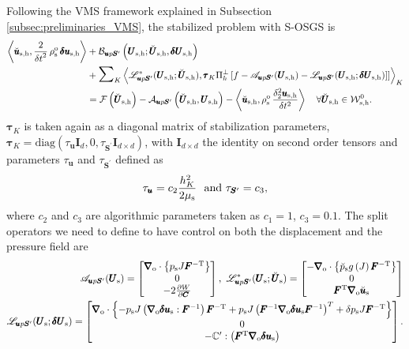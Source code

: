 \documentclass[11pt,english]{article}
\def\psolid{p_{\rm{s}}}                         %
\def\devPK{\pmb{S}^\prime}                      %
\def\unknosolid{\pmb{U}_{\rm{s}}}               %
\def\testusolid{\breve{\pmb{u}}_{\rm{s}}}       %
\def\testpsolid{\breve{p}_{\rm{s}}}             %
\def\testsolid{\breve{\pmb{U}}_{\rm{s}}}        %
\def\usolidinc{\pmb{\delta u}_{\rm{s}}}                   %
\def\psolidinc{\delta p_{\rm{s}}}                         %
\def\unknosolidinc{\pmb{\delta U}_{\rm{s}}}               %
\def\usolidh{\pmb{u}_{\rm{s},\rm{h}}}                    %
\def\unknosolidh{\pmb{U}_{\rm{s},\rm{h}}}                %
\def\testusolidh{\breve{\pmb{u}}_{\rm{s},\rm{h}}}       %
\def\testsolidh{\breve{\pmb{U}}_{\rm{s},\rm{h}}}        %
\def\usolidinch{\pmb{\delta u}_{\rm{s},\rm{h}}}           %
\def\unknosolidinch{\pmb{\delta U}_{\rm{s},\rm{h}}}       %
\def\testsolidspaceh{\mathcal{W}_{\rm{s},\rm{h}}^{0}}     %
\def\u{{\pmb u}}                            %
\def\C{\pmb{C}}                             %
\def\Ftrans{\pmb{F}^{\rm{T}}}               %
\def\invF{\pmb{F}^{-1}}                     %
\def\invFtrans{\pmb{F}^{-\rm{T}}}           %
\def\dWdC{\frac{\partial W}{\partial \C}}   %
\def\grad{\pmb{\nabla}_{\rm{o}}}        %
\def\div{\grad \cdot}                   %
\def\denssolid{\rho_{\rm{s}}^{\rm{o}}}  %
\def\musolid{\mu_{\rm{s}}}              %
\def\ups{\pmb{u} p \devPK}
\def\dt{{\delta t}}                                     %
\def\BDFduhdt2{\frac{\delta_2^2 \usolidh}{\delta t^2}}    %
\begin{document}
Following the VMS framework explained in Subsection \ref{subsec:preliminaries_VMS}, the stabilized problem with S-OSGS is 
\begin{align*}
      \left \langle \testusolidh , \frac{2}{\dt^2}\, \denssolid \, \usolidinch \right \rangle &+ \mathcal{B}_{\ups} \left ( \unknosolidh ; \testsolidh, \unknosolidinch \right) \\
      &+ \scalebox{1.6}{$\sum$}_K  \left \langle  {\mathscr L}_{\ups}^\ast (\unknosolidh ; \testsolidh ) , \pmb{\tau}_{K} \Pi_h^\bot \left [ f - {\mathscr A}_{\ups}(\unknosolidh) - {\mathscr L}_{\ups} (\unknosolidh ; \unknosolidinch)  ] \right] \right \rangle_K  \nonumber \\  
     &= \mathcal{F} \left ( \testsolidh  \right) -  \mathcal{A}_{\ups} \left ( \testsolidh , \unknosolidh \right) - \left \langle \testusolidh, \denssolid \, \BDFduhdt2 \right \rangle \quad \forall \testsolidh \in \testsolidspaceh. 
\label{eq:linearized_spatial_discretized_stabilized_ups}
\end{align*} 
$\pmb{\tau}_K$ is taken again as a diagonal matrix of stabilization parameters, $\pmb{\tau}_K=\text{diag}\left(\tau_{\u}\pmb{I}_{d},0,\tau_{\devPK}\pmb{I}_{d\times d}\right)$, with $\pmb{I}_{d \times d}$ the identity on second order tensors and parameters $\tau_{\u}$ and $\tau_{\devPK}$ defined as
\begin{equation}
     \tau_{\u} = c_2 \frac{h_K^2}{2\musolid} ~ \text{ and} ~ \tau_{\devPK} = c_3 \label{eq:stabilization_parameter_ups},
\end{equation}
where $c_2$ and $c_3$ are algorithmic parameters taken as $c_1 = 1$, $c_3 = 0.1$. The split operators we need to define to have control on both the displacement and the pressure field are
\begin{align}
    {\mathscr A}_{\ups}(\unknosolid) = \begin{bmatrix}
    \div \left \lbrace \psolid J \invFtrans \right \rbrace \\
    0 \\
    -2\dWdC
\end{bmatrix}, ~ {\mathscr L}_{\ups}^\ast (\unknosolid ; \testsolid ) = \begin{bmatrix}
   -\div \left \lbrace \testpsolid g \left(J \right) \invFtrans \right \rbrace \\
    0 \\
    \Ftrans \grad \testusolid
\end{bmatrix} \nonumber \\
{\mathscr L}_{\ups} (\unknosolid ; \unknosolidinc) = \begin{bmatrix}
    \div \left \lbrace - \psolid J \left ( \grad \usolidinc : \invF \right ) \invFtrans + \psolid J \left ( \invF \grad \usolidinc \invF \right )^T +  \psolidinc J \invFtrans \right \rbrace \\
    0 \\
    -\mathbb{C}^\prime : \left ( \Ftrans \grad \usolidinc  \right )
\end{bmatrix}.
\end{align}
\end{document}

